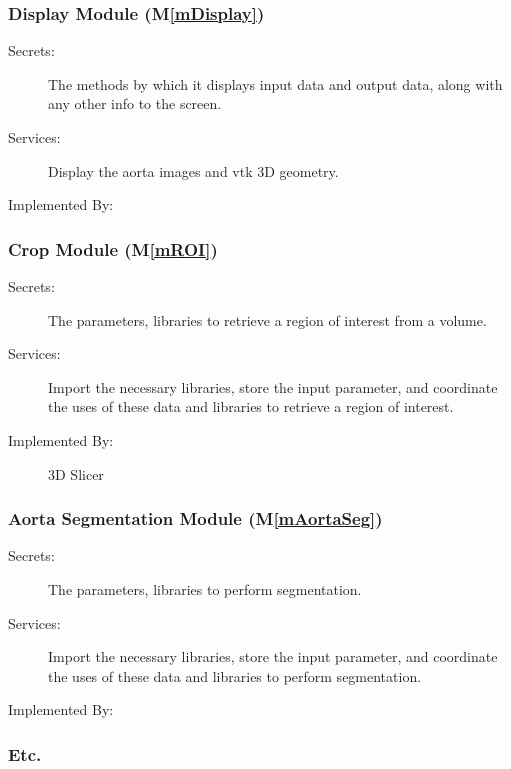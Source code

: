 \documentclass[12pt, titlepage]{article}
\newcommand{\mref}[1]{M\ref{#1}}
\begin{document}
\subsubsection{Display Module (\mref{mDisplay})}
\begin{description}
\item[Secrets:]The methods by which it displays input data and output data, along 
with any other info to the screen.
\item[Services:]Display the aorta images and vtk 3D geometry.
\item[Implemented By:] \progname
\end{description}

\subsubsection{Crop Module (\mref{mROI})}
\begin{description}
\item[Secrets:] The parameters, libraries to retrieve a region of interest from a volume.
\item[Services:] Import the necessary libraries, store the input parameter, and coordinate the uses of these data and libraries to retrieve a region of interest.
\item[Implemented By:] 3D Slicer
\end{description}

\subsubsection{Aorta Segmentation Module (\mref{mAortaSeg})}
\begin{description}
\item[Secrets:] The parameters, libraries to perform segmentation.
\item[Services:] Import the necessary libraries, store the input parameter, and coordinate the uses of these data and libraries to perform segmentation.
\item[Implemented By:] \progname
\end{description}


\subsubsection{Etc.}
\end{document}

